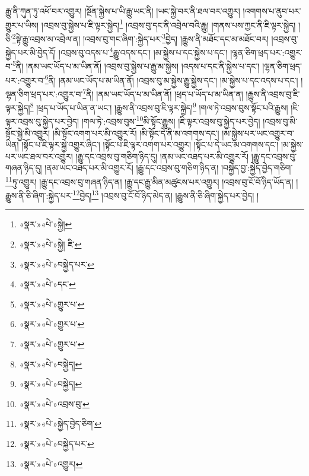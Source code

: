 རྒྱུ་ནི་ཀུན་ཏུ་འཕོ་བར་འགྱུར། །སྔོན་སྐྱེས་པ་ཡི་རྒྱུ་ཡང་ནི། །ཡང་སྐྱེ་བར་ནི་ཐལ་བར་འགྱུར། །འགགས་པ་ནུབ་པར་གྱུར་པ་ཡིས། །འབྲས་བུ་སྐྱེས་པ་ཇི་ལྟར་སྐྱེད།\footnote{«སྣར་»«པེ་»སྐྱེ།} །འབྲས་བུ་དང་ནི་འབྲེལ་བའི་རྒྱུ། །གནས་པས་ཀྱང་ནི་ཇི་ལྟར་སྐྱེད། །ཅི་\footnote{«སྣར་»«པེ་»སྐྱེ། ཇི་}སྟེ་རྒྱུ་འབྲས་མ་འབྲེལ་ན། །འབྲས་བུ་གང་ཞིག་:སྐྱེད་པར་\footnote{«སྣར་»«པེ་»བསྐྱེད་པར་}བྱེད། །རྒྱུས་ནི་མཐོང་དང་མ་མཐོང་བར། །འབྲས་བུ་སྐྱེད་པར་མི་བྱེད་དོ། །འབྲས་བུ་འདས་པ་\footnote{«སྣར་»«པེ་»དང་}རྒྱུ་འདས་དང་། །མ་སྐྱེས་པ་དང་སྐྱེས་པ་དང་། །ལྷན་ཅིག་ཕྲད་པར་:འགྱུར་བ་\footnote{«སྣར་»«པེ་»གྱུར་པ་}ནི། །ནམ་ཡང་ཡོད་པ་མ་ཡིན་ནོ། །འབྲས་བུ་སྐྱེས་པ་རྒྱུ་མ་སྐྱེས། །འདས་པ་དང་ནི་སྐྱེས་པ་དང་། །ལྷན་ཅིག་ཕྲད་པར་:འགྱུར་བ་\footnote{«སྣར་»«པེ་»གྱུར་པ་}ནི། །ནམ་ཡང་ཡོད་པ་མ་ཡིན་ནོ། །འབྲས་བུ་མ་སྐྱེས་རྒྱུ་སྐྱེས་དང་། །མ་སྐྱེས་པ་དང་འདས་པ་དང་། །ལྷན་ཅིག་ཕྲད་པར་:འགྱུར་བ་\footnote{«སྣར་»«པེ་»གྱུར་པ་}ནི། །ནམ་ཡང་ཡོད་པ་མ་ཡིན་ནོ། །ཕྲད་པ་ཡོད་པ་མ་ཡིན་ན། །རྒྱུས་ནི་འབྲས་བུ་ཇི་ལྟར་སྐྱེད།\footnote{«སྣར་»«པེ་»བསྐྱེད།} །ཕྲད་པ་ཡོད་པ་ཡིན་ན་ཡང་། །རྒྱུས་ནི་འབྲས་བུ་ཇི་ལྟར་སྐྱེད།\footnote{«སྣར་»«པེ་»བསྐྱེད།} །གལ་ཏེ་འབྲས་བུས་སྟོང་པའི་རྒྱུས། །ཇི་ལྟར་འབྲས་བུ་སྐྱེད་པར་བྱེད། །གལ་ཏེ་:འབྲས་བུས་\footnote{«སྣར་»«པེ་»འབྲས་བུ་}མི་སྟོང་རྒྱུས། །ཇི་ལྟར་འབྲས་བུ་སྐྱེད་པར་བྱེད། །འབྲས་བུ་མི་སྟོང་སྐྱེ་མི་འགྱུར། །མི་སྟོང་འགག་པར་མི་འགྱུར་རོ། །མི་སྟོང་དེ་ནི་མ་འགགས་དང་། །མ་སྐྱེས་པར་ཡང་འགྱུར་བ་ཡིན། །སྟོང་པ་ཇི་ལྟར་སྐྱེ་འགྱུར་ཞིང་། །སྟོང་པ་ཇི་ལྟར་འགག་པར་འགྱུར། །སྟོང་པ་དེ་ཡང་མ་འགགས་དང་། །མ་སྐྱེས་པར་ཡང་ཐལ་བར་འགྱུར། །རྒྱུ་དང་འབྲས་བུ་གཅིག་ཉིད་དུ། །ནམ་ཡང་འཐད་པར་མི་འགྱུར་རོ། །རྒྱུ་དང་འབྲས་བུ་གཞན་ཉིད་དུ། །ནམ་ཡང་འཐད་པར་མི་འགྱུར་རོ། །རྒྱུ་དང་འབྲས་བུ་གཅིག་ཉིད་ན། །བསྐྱེད་བྱ་:སྐྱེད་བྱེད་གཅིག་\footnote{«སྣར་»«པེ་»སྐྱེད་བྱེད་ཅིག་}ཏུ་འགྱུར། །རྒྱུ་དང་འབྲས་བུ་གཞན་ཉིད་ན། །རྒྱུ་དང་རྒྱུ་མིན་མཚུངས་པར་འགྱུར། །འབྲས་བུ་ངོ་བོ་ཉིད་ཡོད་ན། །རྒྱུས་ནི་ཅི་ཞིག་:སྐྱེད་པར་\footnote{«སྣར་»«པེ་»བསྐྱེད་པར་}བྱེད།\footnote{«སྣར་»«པེ་»འགྱུར།} །འབྲས་བུ་ངོ་བོ་ཉིད་མེད་ན། །རྒྱུས་ནི་ཅི་ཞིག་སྐྱེད་པར་བྱེད། །
